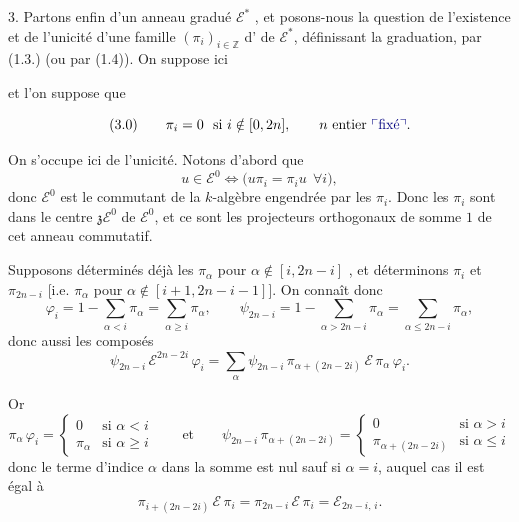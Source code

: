 \documentclass[11pt,a4paper]{article}
\begin{document}

3.  Partons enfin d'un  anneau gradué
$\mathcal{E}^{*}$ , et posons-nous la question de l'existence et
de l'unicité d'une famille $(\pi_{i})_{i \in \mathbb{Z}}$  d'\ill{} de $\mathcal{E}^{*}$, définissant la graduation, par (1.3.)
(ou par (1.4)). On suppose ici


\struck{\ill{}} et  l'on suppose que

\[ (3.0) \qquad \pi_{i} = 0 \ \text{ si } i \notin [0, 2n], \qquad n \ \text{entier \add{fixé}} . \]

 On s'occupe ici de l'unicité.  Notons d'abord que
\[ u \in \mathcal{E}^{0} \iff \bigl( u \pi_{i} = \pi_{i} u \ \ \forall i \bigr) , \]
donc $\mathcal{E}^{0}$ est le commutant de la $k$-algèbre engendrée par les
$\pi_{i}$. Donc les $\pi_{i}$ sont dans le centre
$\mathfrak{z}\mathcal{E}^{0}$ de $\mathcal{E}^{0}$, et ce sont les projecteurs
 orthogonaux de somme $1$ de cet anneau commutatif.

Supposons déterminés déjà les $\pi_{\alpha}$ pour
$\alpha \notin [i, 2n-i]$ , et déterminons $\pi_{i}$ et
$\pi_{2n-i}$ [i.e. $\pi_{\alpha}$ pour $\alpha \notin [i+1, 2n-i-1]$]. On
connaît donc
\[ \varphi_{i} = 1 - \sum_{\alpha < i} \pi_{\alpha} = \sum_{\alpha \geqslant i} \pi_{\alpha} , \qquad \psi_{2n-i} = 1 - \sum_{\alpha > 2n-i} \pi_{\alpha} = \sum_{\alpha \leqslant 2n-i} \pi_{\alpha} , \]
donc aussi les composés
\[ \psi_{2n-i}\, \mathcal{E}^{2n-2i}\, \varphi_{i} = \sum_{\alpha} \psi_{2n-i}\, \pi_{\alpha + (2n-2i)}\, \mathcal{E}\, \pi_{\alpha}\, \varphi_{i} . \]


Or
\[ \pi_{\alpha}\, \varphi_{i} = \begin{cases} 0 & \text{si } \alpha < i \\ \pi_{\alpha} & \text{si } \alpha \geqslant i \end{cases} \qquad \text{et} \qquad \psi_{2n-i}\, \pi_{\alpha+(2n-2i)} = \begin{cases} 0 & \text{si } \alpha > i \\ \pi_{\alpha+(2n-2i)} & \text{si } \alpha \leqslant i \end{cases} \]
donc le terme d'indice $\alpha$ dans la somme est nul sauf si $\alpha = i$,
auquel cas il est égal à
\[ \pi_{i+(2n-2i)}\, \mathcal{E}\, \pi_{i} = \pi_{2n-i}\, \mathcal{E}\, \pi_{i} = \mathcal{E}_{2n-i,\,i} . \]
\end{document}
